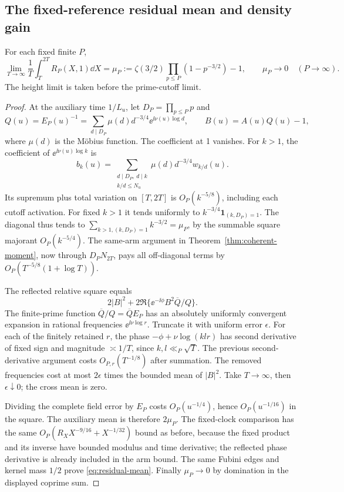 \subsection{The fixed-reference residual mean and density gain}
\begin{theorem}\label{thm:residual-mean}
For each fixed finite \(P\),
\begin{equation}\label{eq:residual-mean}
 \lim_{T\to\infty}\frac1T\int_T^{2T}R_P(X,1)\dd X
 =\mu_P:=\zeta(3/2)\prod_{p\le P}(1-p^{-3/2})-1,
 \qquad \mu_P\longrightarrow0\quad(P\to\infty).
\end{equation}
The height limit is taken before the prime-cutoff limit.
\end{theorem}
\begin{proof}
At the auxiliary time \(1/L_u\), let \(D_P=\prod_{p\le P}p\) and
\[
 Q(u)=E_P(u)^{-1}=\sum_{d\mid D_P}\mu(d)d^{-3/4}
                  \ee^{\ii\nu(u)\log d},\qquad B(u)=A(u)Q(u)-1,
\]
where \(\mu(d)\) is the M\"obius function. The coefficient at 1
vanishes. For \(k>1\), the coefficient of
\(\ee^{\ii\nu(u)\log k}\) is
\[
 b_k(u)=\sum_{\substack{d\mid D_P,\ d\mid k\\ k/d\le N_u}}
                     \mu(d)d^{-3/4}w_{k/d}(u).
\]
Its supremum plus total variation on \([T,2T]\) is
\(O_P(k^{-5/8})\), including each cutoff activation. For fixed
\(k>1\) it tends uniformly to \(k^{-3/4}\mathbf1_{(k,D_P)=1}\).
The diagonal thus tends to
\(\sum_{k>1,(k,D_P)=1}k^{-3/2}=\mu_P\), by the summable square
majorant \(O_P(k^{-5/4})\). The same-arm argument in
Theorem~\ref{thm:coherent-moment}, now through \(D_PN_{2T}\),
pays all off-diagonal terms by \(O_P(T^{-5/8}(1+\log T))\).

The reflected relative square equals
\[
 2|B|^2+2\Re\{\ee^{-\ii\phi}B^2\overline Q/Q\}.
\]
The finite-prime function \(\overline Q/Q=\overline Q E_P\) has
an absolutely uniformly convergent expansion in rational frequencies
\(\ee^{\ii\nu\log r}\). Truncate it with uniform error
\(\epsilon\). For each of the finitely retained \(r\), the phase
\(-\phi+\nu\log(klr)\) has second derivative of fixed sign and
magnitude \(\asymp1/T\), since \(k,l\ll_P\sqrt T\).
The previous second-derivative argument costs \(O_{P,r}(T^{-1/8})\)
after summation. The removed frequencies cost at most
\(2\epsilon\) times the bounded mean of \(|B|^2\).
Take \(T\to\infty\), then \(\epsilon\downarrow0\); the cross
mean is zero.

Dividing the complete field error by \(E_P\) costs
\(O_P(u^{-1/4})\), hence \(O_P(u^{-1/16})\) in the square.
The auxiliary mean is therefore \(2\mu_P\).
The fixed-clock comparison has the same
\(O_P(R_XX^{-9/16}+X^{-1/32})\) bound as before, because the fixed
product and its inverse have bounded modulus and time derivative;
the reflected phase derivative is already included in the arm bound.
The same Fubini edges and kernel mass \(1/2\) prove
\eqref{eq:residual-mean}. Finally \(\mu_P\to0\) by domination in
the displayed coprime sum.
\end{proof}

